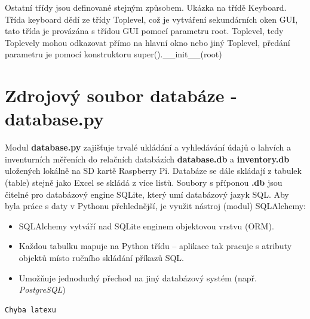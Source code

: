 Ostatní třídy jsou definované stejným způsobem. Ukázka na třídě Keyboard. Třída keyboard dědí ze třídy Toplevel, což je vytváření sekundárních oken GUI, tato třída je provázána s třídou GUI pomocí parametru root. Toplevel, tedy Toplevely mohou odkazovat přímo na hlavní okno nebo jiný Toplevel, předání parametru je pomocí konstruktoru super().\_\_init\_\_(root)

%
%        


\section{Zdrojový soubor databáze - database.py}

Modul \textbf{database.py} zajišťuje trvalé ukládání a vyhledávání údajů o lahvích a inventurních měřeních do relačních databázích \textbf{database.db} a \textbf{inventory.db} uložených lokálně na SD kartě Raspberry Pi. Databáze se dále skládají z tabulek (table) stejně jako Excel se skládá z více listů. Soubory s příponou \textbf{.db} jsou čitelné pro databázový engine SQLite, který umí databázový jazyk SQL. Aby byla práce s daty v Pythonu přehlednější, je využit nástroj (modul) SQLAlchemy:
\begin{itemize}
    \item SQLAlchemy vytváří nad SQLite enginem objektovou vrstvu (ORM).
    \item Každou tabulku mapuje na Python třídu – aplikace tak pracuje s atributy objektů místo ručního skládání příkazů SQL.
    \item Umožňuje jednoduchý přechod na jiný databázový systém (např. \textit{PostgreSQL})
\end{itemize}

\begin{lstlisting}[language=Python,breaklines=false, frame=single, caption=Ukázka třídy database.db a inventory.db]
Chyba latexu
\end{lstlisting}

